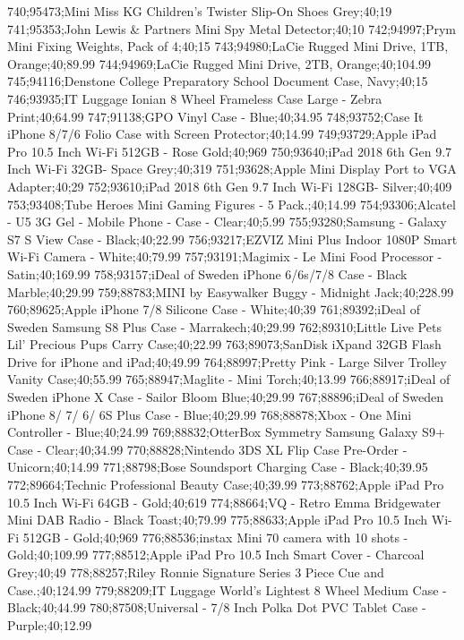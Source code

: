 740;95473;Mini Miss KG Children's Twister Slip-On Shoes Grey;40;19
741;95353;John Lewis & Partners Mini Spy Metal Detector;40;10
742;94997;Prym Mini Fixing Weights, Pack of 4;40;15
743;94980;LaCie Rugged Mini Drive, 1TB, Orange;40;89.99
744;94969;LaCie Rugged Mini Drive, 2TB, Orange;40;104.99
745;94116;Denstone College Preparatory School Document Case, Navy;40;15
746;93935;IT Luggage Ionian 8 Wheel Frameless Case Large - Zebra Print;40;64.99
747;91138;GPO Vinyl Case - Blue;40;34.95
748;93752;Case It iPhone 8/7/6 Folio Case with Screen Protector;40;14.99
749;93729;Apple iPad Pro 10.5 Inch Wi-Fi 512GB - Rose Gold;40;969
750;93640;iPad 2018 6th Gen 9.7 Inch Wi-Fi 32GB- Space Grey;40;319
751;93628;Apple Mini Display Port to VGA Adapter;40;29
752;93610;iPad 2018 6th Gen 9.7 Inch Wi-Fi 128GB- Silver;40;409
753;93408;Tube Heroes Mini Gaming Figures - 5 Pack.;40;14.99
754;93306;Alcatel - U5 3G Gel - Mobile Phone - Case - Clear;40;5.99
755;93280;Samsung - Galaxy S7 S View Case - Black;40;22.99
756;93217;EZVIZ Mini Plus Indoor 1080P Smart Wi-Fi Camera - White;40;79.99
757;93191;Magimix - Le Mini Food Processor - Satin;40;169.99
758;93157;iDeal of Sweden iPhone 6/6s/7/8 Case - Black Marble;40;29.99
759;88783;MINI by Easywalker Buggy - Midnight Jack;40;228.99
760;89625;Apple iPhone 7/8 Silicone Case - White;40;39
761;89392;iDeal of Sweden Samsung S8 Plus Case - Marrakech;40;29.99
762;89310;Little Live Pets Lil' Precious Pups Carry Case;40;22.99
763;89073;SanDisk iXpand 32GB Flash Drive for iPhone and iPad;40;49.99
764;88997;Pretty Pink - Large Silver Trolley Vanity Case;40;55.99
765;88947;Maglite - Mini Torch;40;13.99
766;88917;iDeal of Sweden iPhone X Case - Sailor Bloom Blue;40;29.99
767;88896;iDeal of Sweden iPhone 8/ 7/ 6/ 6S Plus Case - Blue;40;29.99
768;88878;Xbox - One Mini Controller - Blue;40;24.99
769;88832;OtterBox Symmetry Samsung Galaxy S9+ Case - Clear;40;34.99
770;88828;Nintendo 3DS XL Flip Case Pre-Order - Unicorn;40;14.99
771;88798;Bose Soundsport Charging Case - Black;40;39.95
772;89664;Technic Professional Beauty Case;40;39.99
773;88762;Apple iPad Pro 10.5 Inch Wi-Fi 64GB - Gold;40;619
774;88664;VQ - Retro Emma Bridgewater Mini DAB Radio - Black Toast;40;79.99
775;88633;Apple iPad Pro 10.5 Inch Wi-Fi 512GB - Gold;40;969
776;88536;instax Mini 70 camera with 10 shots - Gold;40;109.99
777;88512;Apple iPad Pro 10.5 Inch Smart Cover - Charcoal Grey;40;49
778;88257;Riley Ronnie Signature Series 3 Piece Cue and Case.;40;124.99
779;88209;IT Luggage World's Lightest 8 Wheel Medium Case - Black;40;44.99
780;87508;Universal - 7/8 Inch Polka Dot PVC Tablet Case - Purple;40;12.99
